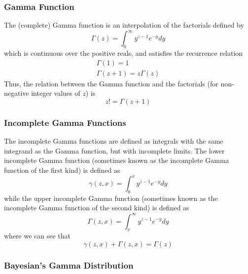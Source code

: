 \documentclass[11pt]{report} %
\begin{document}
\subsubsection{Gamma Function}

The (complete) Gamma function is an interpolation of the factorials defined by
\begin{equation}
\Gamma\left(z\right) = \int_{0}^{\infty}y^{z - 1}e^{-y}dy
\end{equation}
which is continuous over the positive reals, and satisfies the recurrence relation
\begin{gather}
\Gamma\left(1\right) = 1 \\
\Gamma\left(z + 1\right) = z\Gamma\left(z\right)
\end{gather}
Thus, the relation between the Gamma function and the factorials (for non-negative integer values of $z$) is
\begin{equation}
z! = \Gamma\left(z + 1\right)
\end{equation}

\subsubsection{Incomplete Gamma Functions}

The incomplete Gamma functions are defined as integrals with the same integrand as the Gamma function, but with incomplete limits. The lower incomplete Gamma function (sometimes known as the incomplete Gamma function of the first kind) is defined as
\begin{equation}
\gamma\left(z, x\right) = \int_{0}^{x}y^{z - 1}e^{-y}dy
\end{equation}
while the upper incomplete Gamma function (sometimes known as the incomplete Gamma function of the second kind) is defined as
\begin{equation}
\Gamma\left(z, x\right) = \int_{x}^{\infty}y^{z - 1}e^{-y}dy
\end{equation}
where we can see that
\begin{equation}
\gamma\left(z, x\right) + \Gamma\left(z, x\right) = \Gamma\left(z\right)
\end{equation}

\subsubsection{Bayesian's Gamma Distribution}
\end{document}
